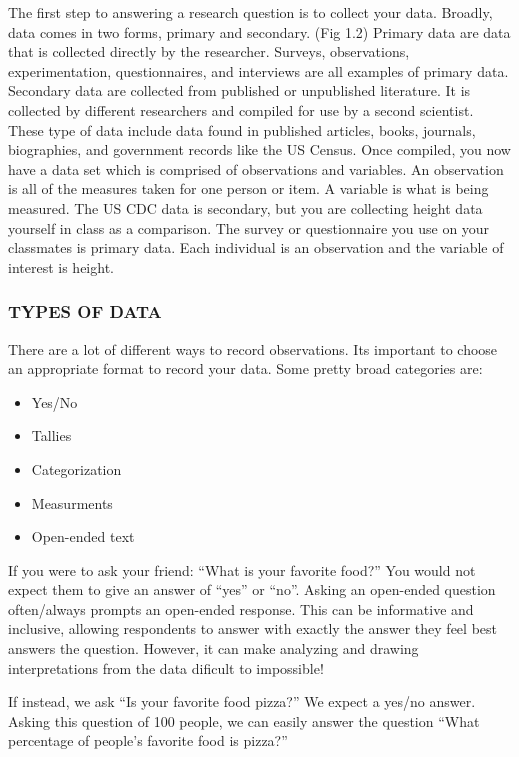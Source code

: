 \documentclass[
]{book}
\providecommand{\tightlist}{%
  \setlength{\itemsep}{0pt}\setlength{\parskip}{0pt}}
\begin{document}
The first step to answering a research question is to collect your data. Broadly, data comes in two forms, primary and secondary. (Fig 1.2) Primary data are data that is collected directly by the researcher. Surveys, observations, experimentation, questionnaires, and interviews are all examples of primary data. Secondary data are collected from published or unpublished literature. It is collected by different researchers and compiled for use by a second scientist. These type of data include data found in published articles, books, journals, biographies, and government records like the US Census.
Once compiled, you now have a data set which is comprised of observations and variables. An observation is all of the measures taken for one person or item. A variable is what is being measured.
The US CDC data is secondary, but you are collecting height data yourself in class as a comparison. The survey or questionnaire you use on your classmates is primary data. Each individual is an observation and the variable of interest is height.

\hypertarget{types-of-data}{%
\subsubsection{TYPES OF DATA}\label{types-of-data}}

There are a lot of different ways to record observations. Its important to choose an appropriate format to record your data. Some pretty broad categories are:

\begin{itemize}
\tightlist
\item
  Yes/No
\item
  Tallies
\item
  Categorization
\item
  Measurments
\item
  Open-ended text
\end{itemize}

If you were to ask your friend: ``What is your favorite food?'' You would not expect
them to give an answer of ``yes'' or ``no''. Asking an open-ended question often/always prompts an open-ended response. This can be informative and inclusive, allowing respondents to answer with exactly the answer they feel best answers the question. However, it can make analyzing and drawing interpretations from the data dificult to impossible!

If instead, we ask ``Is your favorite food pizza?'' We expect a yes/no answer. Asking this question of 100 people, we can easily answer the question ``What percentage of people's favorite food is pizza?''
\end{document}

